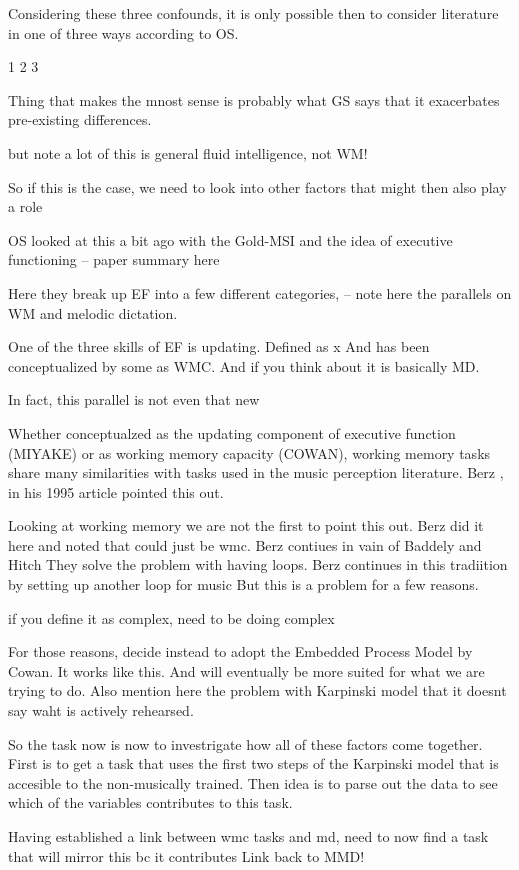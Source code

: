 \documentclass[]{book}
\begin{document}
Considering these three confounds, it is only possible then to consider literature in one of three ways according to OS.

1
2
3

Thing that makes the mnost sense is probably what GS says that it exacerbates pre-existing differences.

but note a lot of this is general fluid intelligence, not WM!

So if this is the case, we need to look into other factors that might then also play a role

OS looked at this a bit ago with the Gold-MSI and the idea of executive functioning
-- paper summary here

Here they break up EF into a few different categories,
-- note here the parallels on WM and melodic dictation.

One of the three skills of EF is updating.
Defined as x
And has been conceptualized by some as WMC.
And if you think about it is basically MD.

In fact, this parallel is not even that new

Whether conceptualzed as the updating component of executive function (MIYAKE) or as working memory capacity (COWAN), working memory tasks share many similarities with tasks used in the music perception literature.
Berz \citep{berzWorkingMemoryMusic1995}, in his 1995 article pointed this out.

Looking at working memory we are not the first to point this out.
Berz did it here and noted that could just be wmc.
Berz contiues in vain of Baddely and Hitch
They solve the problem with having loops.
Berz continues in this tradiition by setting up another loop for music
But this is a problem for a few reasons.

if you define it as complex, need to be doing complex

For those reasons, decide instead to adopt the Embedded Process Model by Cowan.
It works like this.
And will eventually be more suited for what we are trying to do.
Also mention here the problem with Karpinski model that it doesnt say waht is actively rehearsed.

So the task now is now to investrigate how all of these factors come together.
First is to get a task that uses the first two steps of the Karpinski model that is accesible to the non-musically trained.
Then idea is to parse out the data to see which of the variables contributes to this task.

Having established a link between wmc tasks and md, need to now find a task that will mirror this bc it contributes
Link back to MMD!
\end{document}
